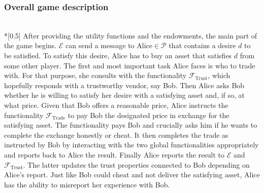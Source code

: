 \subsubsection{Overall game description} \ \\*[0.5\baselineskip]
  After providing the utility functions and the endowments, the main part of the game
  begins. $\mathcal{E}$ can send a message to $\mathrm{Alice} \in \mathcal{P}$ that
  contains a desire $d$ to be satisfied. To satisfy this desire, Alice has to buy an asset
  that satisfies $d$ from some other player. The first and most important task Alice faces
  is who to trade with. For that purpose, she consults with the functionality
  $\mathcal{F}_{\mathrm{Trust}}$, which hopefully responds with a trustworthy vendor, say
  Bob. Then Alice asks Bob whether he is willing to satisfy her desire with a satisfying
  asset and, if so, at what price. Given that Bob offers a reasonable price, Alice
  instructs the functionality $\mathcal{F}_{\mathrm{Trade}}$ to pay Bob the designated
  price in exchange for the satisfying asset. The functionality pays Bob and crucially
  asks him if he wants to complete the exchange honestly or cheat. It then completes the
  trade as instructed by Bob by interacting with the two global functionalities
  appropriately and reports back to Alice the result. Finally Alice reports the result to
  $\mathcal{E}$ and $\mathcal{F}_{\mathrm{Trust}}$. The latter updates the trust
  properties connected to Bob depending on Alice's report. Just like Bob could cheat and
  not deliver the satisfying asset, Alice has the ability to misreport her experience with
  Bob.
